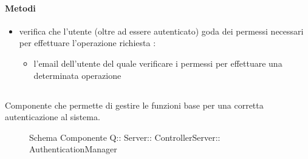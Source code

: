 \paragraph{Metodi}
\begin{itemize}
\item {}
\newline
verifica che l'utente (oltre ad essere autenticato) goda dei permessi necessari per effettuare l'operazione richiesta
\newline
{} :
\begin{itemize}
\item {}
\newline
l'email dell'utente del quale verificare i permessi per effettuare una determinata operazione
\end{itemize}
\end{itemize}
\subsection{}
Componente che permette di gestire le funzioni base per una corretta autenticazione al sistema.
\begin{figure}[H]
\centering
\noindent{}
\caption[Schema Componente Quizzipedia::Server::ControllerServer::AuthenticationManager]{Schema Componente Q:: Server:: ControllerServer:: AuthenticationManager}
\end{figure}
